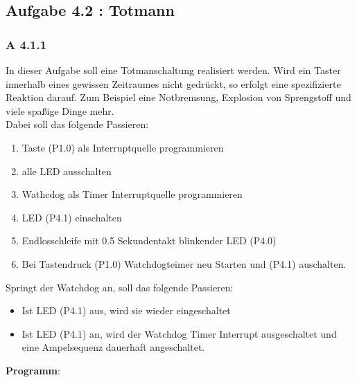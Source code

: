 \subsection*{Aufgabe 4.2 : Totmann}

\subsubsection*{A 4.1.1}

In dieser Aufgabe soll eine Totmanschaltung realisiert werden. Wird ein Taster innerhalb eines gewissen Zeitraumes nicht gedrückt, so erfolgt eine spezifizierte Reaktion darauf. Zum Beispiel eine Notbremsung, Explosion von Sprengstoff und viele spaßige Dinge mehr.\\

Dabei soll das folgende Passieren:\\

\begin{enumerate}[1.]
	\item Taste (P1.0) als Interruptquelle programmieren
	\item alle LED ausschalten
	\item Wathcdog als Timer Interruptquelle programmieren
	\item LED (P4.1) einschalten
	\item Endlosschleife mit 0.5 Sekundentakt blinkender LED (P4.0)
	\item Bei Tastendruck (P1.0) Watchdogteimer neu Starten und (P4.1) auschalten.
\end{enumerate}

Springt der Watchdog an, soll das folgende Passieren:

\begin{itemize}
	\item Ist LED (P4.1) aus, wird sie wieder eingeschaltet
	\item Ist LED (P4.1) an, wird der Watchdog Timer Interrupt ausgeschaltet und eine Ampelsequenz dauerhaft angeschaltet.
\end{itemize}

\textbf{Programm}:\\


